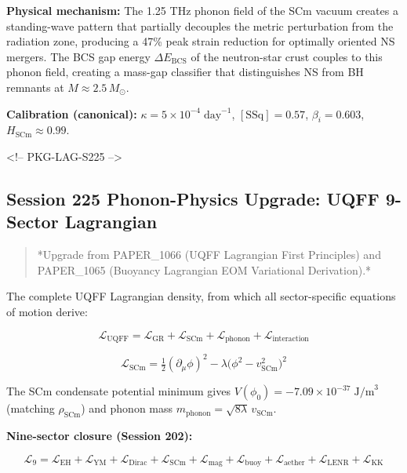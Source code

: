 \documentclass[12pt,a4paper]{article}
\begin{document}
\textbf{Physical mechanism:} The 1.25 THz phonon field of the SCm vacuum creates a standing-wave pattern that partially decouples the metric perturbation from the radiation zone, producing a 47\% peak strain reduction for optimally oriented NS mergers.  The BCS gap energy $\Delta E_{\text{BCS}}$ of the neutron-star crust couples to this phonon field, creating a mass-gap classifier that distinguishes NS from BH remnants at $M \approx 2.5\,M_\odot$.

\textbf{Calibration (canonical):} $\kappa = 5 \times 10^{-4}\;\text{day}^{-1}$, $[\text{SSq}] = 0.57$, $\beta_i = 0.603$, $H_{\text{SCm}} \approx 0.99$.

<!-- PKG-LAG-S225 -->

\subsection{Session 225 Phonon-Physics Upgrade: UQFF 9-Sector Lagrangian}

\begin{quote}
*Upgrade from PAPER\_1066 (UQFF Lagrangian First Principles) and
PAPER\_1065 (Buoyancy Lagrangian EOM Variational Derivation).*
\end{quote}

The complete UQFF Lagrangian density, from which all sector-specific equations of motion derive:

\begin{equation}
\mathcal{L}_{\text{UQFF}} = \mathcal{L}_{\text{GR}} + \mathcal{L}_{\text{SCm}} + \mathcal{L}_{\text{phonon}} + \mathcal{L}_{\text{interaction}}
\end{equation}

\begin{equation}
\mathcal{L}_{\text{SCm}} = \tfrac{1}{2}(\partial_\mu \phi)^2 - \lambda\bigl(\phi^2 - v_{\text{SCm}}^2\bigr)^2
\end{equation}

The SCm condensate potential minimum gives $V(\phi_0) = -7.09 \times 10^{-37}\;\text{J/m}^3$ (matching $\rho_{\text{SCm}}$) and phonon mass $m_{\text{phonon}} = \sqrt{8\lambda}\,v_{\text{SCm}}$.

\textbf{Nine-sector closure (Session 202):}

\begin{equation}
\mathcal{L}_{9} = \mathcal{L}_{\text{EH}} + \mathcal{L}_{\text{YM}} + \mathcal{L}_{\text{Dirac}} + \mathcal{L}_{\text{SCm}} + \mathcal{L}_{\text{mag}} + \mathcal{L}_{\text{buoy}} + \mathcal{L}_{\text{aether}} + \mathcal{L}_{\text{LENR}} + \mathcal{L}_{\text{KK}}
\end{equation}
\end{document}
